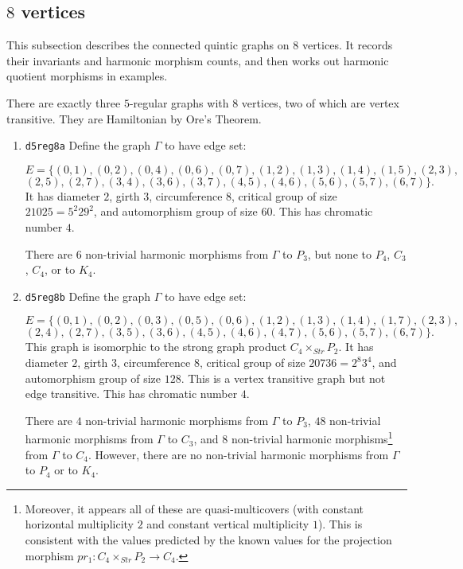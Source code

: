 \documentclass[12pt,letterpaper]{article}
\theoremstyle{definition}
\begin{document}
\subsection{\texorpdfstring{$8$}{8} vertices}
\label{sec:d5reg8}

This subsection describes the connected quintic graphs on $8$ vertices.
It records their invariants and harmonic morphism counts, and then
works out harmonic quotient morphisms in examples.


There are exactly three $5$-regular graphs with $8$ vertices, two of which are vertex transitive.
They are Hamiltonian by Ore's Theorem.


\begin{enumerate}
\item
  {\tt d5reg8a}\newline
  Define the graph  $\Gamma$
  to have edge set:

\[
E = \{
(0, 1), (0, 2), (0, 4), (0, 6), (0, 7), (1, 2), (1, 3), (1, 4), (1, 5), (2, 3),
\]
\[
(2, 5), (2, 7), (3, 4), (3, 6), (3, 7), (4, 5), (4, 6), (5, 6), (5, 7), (6, 7)
\}.
\]
It has diameter $2$,
girth $3$, circumference $8$, 
critical group of size $21025 = 5^2 29^2$, 
and automorphism group of size $60$. This has chromatic number $4$.

There are $6$ non-trivial harmonic morphisms from $\Gamma$ to $P_3$,
but none to $P_4$, $C_3$, $C_4$, or to $K_4$.

\item
  {\tt d5reg8b}\newline
Define the graph  $\Gamma$ to have edge set:
  

\[
E = \{
(0, 1), (0, 2), (0, 3), (0, 5), (0, 6), (1, 2), (1, 3), (1, 4), (1, 7), (2, 3), 
\]
\[
(2, 4), (2, 7), (3, 5), (3, 6), (4, 5), (4, 6), (4, 7), (5, 6), (5, 7), (6, 7)
\}.
\]
This graph is isomorphic to the strong graph product
$C_4\times_{Str} P_2$. It has diameter $2$,
girth $3$, circumference $8$, 
critical group of size $20736 = 2^8 3^4$, 
and automorphism group of size $128$. This is a vertex transitive graph but not
edge transitive.
This has chromatic number $4$.

There are $4$ non-trivial harmonic morphisms from $\Gamma$ to $P_3$,
$48$ non-trivial harmonic morphisms from $\Gamma$ to $C_3$, and
$8$ non-trivial harmonic
morphisms\footnote{Moreover, it appears all of these are quasi-multicovers
  (with constant horizontal multiplicity $2$ and constant vertical
  multiplicity $1$). This is consistent with the values predicted by
the known values for the projection morphism $pr_1:C_4\times_{Str}P_2 \to C_4$.}
from $\Gamma$ to $C_4$. However, there are
no non-trivial harmonic morphisms from $\Gamma$ to $P_4$ or to $K_4$.



\end{enumerate}
\end{document}
